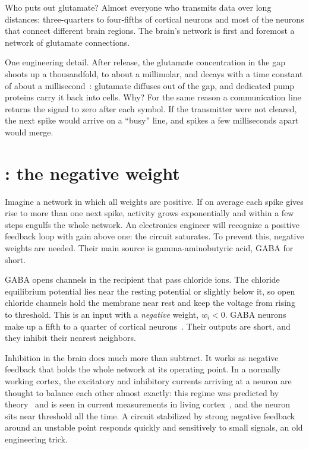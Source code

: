 Who puts out glutamate? Almost everyone who transmits data over long distances: three-quarters to four-fifths of cortical neurons and most of the neurons that connect different brain regions. The brain's network is first and foremost a network of glutamate connections.

One engineering detail. After release, the glutamate concentration in the gap shoots up a thousandfold, to about a millimolar, and decays with a time constant of about a millisecond~\cite{Clements1992}: glutamate diffuses out of the gap, and dedicated pump proteins carry it back into cells. Why? For the same reason a communication line returns the signal to zero after each symbol. If the transmitter were not cleared, the next spike would arrive on a ``busy'' line, and spikes a few milliseconds apart would merge.

\section{: the negative weight}

Imagine a network in which all weights are positive. If on average each spike gives rise to more than one next spike, activity grows exponentially and within a few steps engulfs the whole network. An electronics engineer will recognize a positive feedback loop with gain above one: the circuit saturates. To prevent this, negative weights are needed. Their main source is gamma-aminobutyric acid, GABA for short.

GABA opens channels in the recipient that pass chloride ions. The chloride equilibrium potential lies near the resting potential or slightly below it, so open chloride channels hold the membrane near rest and keep the voltage from rising to threshold. This is an input with a \emph{negative} weight, $w_i<0$. GABA neurons make up a fifth to a quarter of cortical neurons~\cite{Hendry1987}. Their outputs are short, and they inhibit their nearest neighbors.

Inhibition in the brain does much more than subtract. It works as negative feedback that holds the whole network at its operating point. In a normally working cortex, the excitatory and inhibitory currents arriving at a neuron are thought to balance each other almost exactly: this regime was predicted by theory~\cite{vanVreeswijk1996} and is seen in current measurements in living cortex~\cite{Haider2006}, and the neuron sits near threshold all the time. A circuit stabilized by strong negative feedback around an unstable point responds quickly and sensitively to small signals, an old engineering trick.

